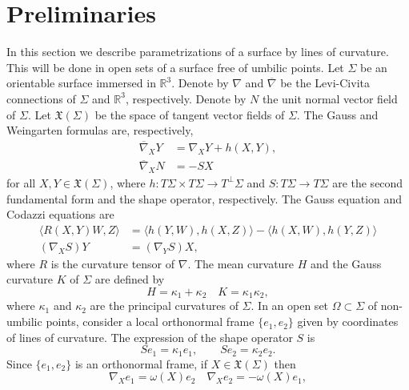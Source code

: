 \documentclass{birkjour}
\theoremstyle{definition}
\theoremstyle{remark}
\numberwithin{equation}{section}
\def\r{\mathbb R}
\begin{document}
\section{Preliminaries}\label{s2}

In this section we describe parametrizations of a surface by lines of curvature. This will be done in open sets of a surface free of umbilic points. Let $\Sigma$ be an orientable surface immersed in $\r^3$. Denote by  $\nabla$ and $\overline{\nabla}$ be the Levi-Civita connections of $\Sigma$ and
$\mathbb{R}^3$, respectively.  Denote by $N$ the unit normal vector field of $\Sigma$. Let $\mathfrak{X}(\Sigma)$ be the space of tangent vector fields of $\Sigma$. The  Gauss and Weingarten formulas are, respectively, 
\begin{equation}\label{gn}  
\begin{split}
    \overline{\nabla}_XY&=\nabla_XY+h(X,Y), \\
    \overline{\nabla}_XN&=-SX
    \end{split}
\end{equation}
for all $X,Y\in\mathfrak{X}(\Sigma)$, where $h\colon T\Sigma\times T\Sigma\to T^\perp\Sigma$ and  $S\colon T\Sigma\to  T\Sigma$ are the second fundamental form and the shape
operator, respectively. The  Gauss
equation and Codazzi equations are 
\begin{equation*}
\begin{split}
    \langle R(X,Y)W,Z\rangle&=\langle h(Y,W),h(X,Z)\rangle-\langle
    h(X,W),h(Y,Z)\rangle\\
    (\nabla_XS)Y&=(\nabla_YS)X,
    \end{split}
\end{equation*}
where $R$ is the curvature tensor of $\nabla$. The   mean curvature $H$ and the Gauss curvature $K$ of $\Sigma$ are defined by  
\[ H= \kappa_1+\kappa_2 \quad K=\kappa_1\kappa_2,\]
where   $\kappa_1$ and $\kappa_2$ are the principal curvatures of $\Sigma$. In an open set $\Omega\subset\Sigma$ of non-umbilic points, consider a local
orthonormal frame $\{e_1,e_2\}$ given by  coordinates of  lines of curvature. The expression of the shape operator $S$ is 
\begin{equation}\label{b0}
Se_1 =\kappa_1 e_1,\qquad Se_2 =\kappa_2 e_2.
    \end{equation}
Since $\{e_1,e_2\}$ is an orthonormal frame, if $X\in\mathfrak{X}(\Sigma)$ then
\begin{equation*}
\nabla_X e_1=\omega(X)e_2\quad  \nabla_X e_2=-\omega(X)e_1,
\end{equation*}
\end{document}
